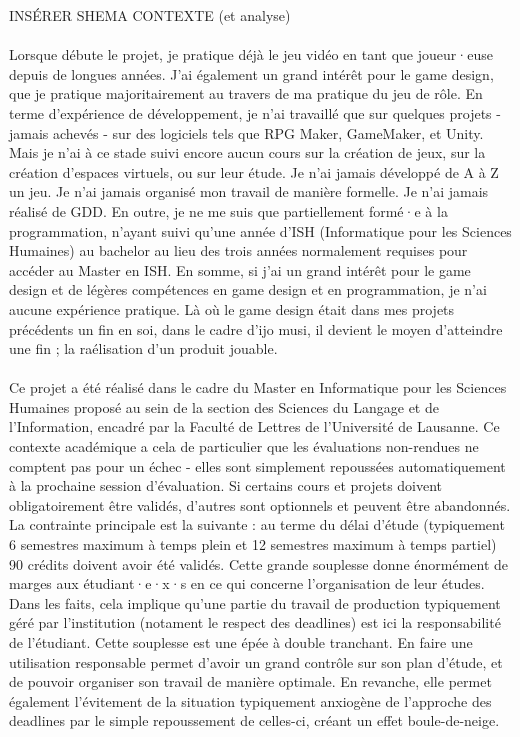 \documentclass{scrartcl}
\let\emph\relax %
\begin{document}
	INSÉRER SHEMA CONTEXTE (et analyse)\\
	
	\emph{Inexpérience}\\
	Lorsque débute le projet, je pratique déjà le jeu vidéo en tant que joueur·euse depuis de longues années. J'ai également un grand intérêt pour le game design, que je pratique majoritairement au travers de ma pratique du jeu de rôle. En terme d'expérience de développement, je n'ai travaillé que sur quelques projets - jamais achevés - sur des logiciels tels que RPG Maker, GameMaker, et Unity. Mais je n'ai à ce stade suivi encore aucun cours sur la création de jeux, sur la création d'espaces virtuels, ou sur leur étude. Je n'ai jamais développé de A à Z un jeu. Je n'ai jamais organisé mon travail de manière formelle. Je n'ai jamais réalisé de GDD. En outre, je ne me suis que partiellement formé·e à la programmation, n'ayant suivi qu'une année d'ISH (Informatique pour les Sciences Humaines) au bachelor au lieu des trois années normalement requises pour accéder au Master en ISH. En somme, si j'ai un grand intérêt pour le game design et de légères compétences en game design et en programmation, je n'ai aucune expérience pratique. Là où le game design était dans mes projets précédents un fin en soi, dans le cadre d'ijo musi, il devient le moyen d'atteindre une fin ; la raélisation d'un produit jouable.\\
	
	\emph{Cadre académique souple}\\
	Ce projet a été réalisé dans le cadre du Master en Informatique pour les Sciences Humaines proposé au sein de la section des Sciences du Langage et de l'Information, encadré par la Faculté de Lettres de l'Université de Lausanne. Ce contexte académique a cela de particulier que les évaluations non-rendues ne comptent pas pour un échec - elles sont simplement repoussées automatiquement à la prochaine session d'évaluation. Si certains cours et projets doivent obligatoirement être validés, d'autres sont optionnels et peuvent être abandonnés. La contrainte principale est la suivante : au terme du délai d'étude (typiquement 6 semestres maximum à temps plein et 12 semestres maximum à temps partiel) 90 crédits doivent avoir été validés. Cette grande souplesse donne énormément de marges aux étudiant·e·x·s en ce qui concerne l'organisation de leur études. Dans les faits, cela implique qu'une partie du travail de production typiquement géré par l'institution (notament le respect des deadlines) est ici la responsabilité de l'étudiant. Cette souplesse est une épée à double tranchant. En faire une utilisation responsable permet d'avoir un grand contrôle sur son plan d'étude, et de pouvoir organiser son travail de manière optimale. En revanche, elle permet également l'évitement de la situation typiquement anxiogène de l'approche des deadlines par le simple repoussement de celles-ci, créant un effet boule-de-neige.\\
	
\end{document}

